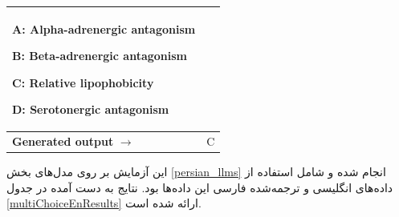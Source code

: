 \documentclass[11pt, a4paper, oneside]{book}
\begin{document}
\begin{table}[ht]
\begin{latin}
\begin{tabular}{|l|p{8cm}|}
							A: Alpha-adrenergic antagonism
							
							B: Beta-adrenergic antagonism
							
							C: Relative lipophobicity
							
							D:‌ Serotonergic antagonism \\
							\hline
							\textbf{Generated output} $\rightarrow$ & C \\
							\hline
						\end{tabular}
						\end{latin}
						\label{multiChoiceQA}
				\end{table}
				
				این آزمایش بر روی مدل‌های بخش \ref{persian_llms} انجام شده و شامل استفاده از داده‌های انگلیسی و ترجمه‌شده فارسی این داده‌ها بود. نتایج به دست آمده در جدول \ref{multiChoiceEnResults} ارائه شده است.
				
\end{document}
